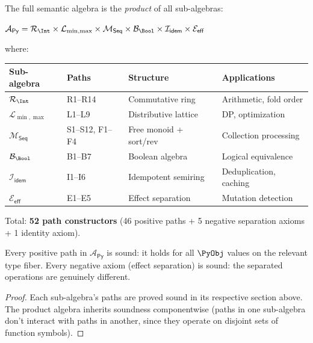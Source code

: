 The full semantic algebra is the \emph{product} of all sub-algebras:

\begin{definition}
\label{def:full-algebra}
$\mathcal{A}_\mathsf{Py} = \mathcal{R}_\Int \times \mathcal{L}_{\min,\max}
\times \mathcal{M}_\mathsf{Seq} \times \mathcal{B}_\Bool \times
\mathcal{I}_\mathsf{idem} \times \mathcal{E}_\mathsf{eff}$

where:
\begin{center}
\begin{tabular}{l l l l}
  \textbf{Sub-algebra} & \textbf{Paths} & \textbf{Structure} &
  \textbf{Applications} \\
  \hline
  $\mathcal{R}_\Int$ & R1--R14 & Commutative ring &
    Arithmetic, fold order \\
  $\mathcal{L}_{\min,\max}$ & L1--L9 & Distributive lattice &
    DP, optimization \\
  $\mathcal{M}_\mathsf{Seq}$ & S1--S12, F1--F4 &
    Free monoid + sort/rev &
    Collection processing \\
  $\mathcal{B}_\Bool$ & B1--B7 & Boolean algebra &
    Logical equivalence \\
  $\mathcal{I}_\mathsf{idem}$ & I1--I6 & Idempotent semiring &
    Deduplication, caching \\
  $\mathcal{E}_\mathsf{eff}$ & E1--E5 & Effect separation &
    Mutation detection \\
\end{tabular}
\end{center}

Total: \textbf{52 path constructors} (46 positive paths + 5 negative
separation axioms + 1 identity axiom).
\end{definition}

\begin{theorem}
Every positive path in $\mathcal{A}_\mathsf{Py}$ is sound: it holds
for all $\PyObj$ values on the relevant type fiber.  Every negative
axiom (effect separation) is sound: the separated operations are
genuinely different.
\end{theorem}

\begin{proof}
Each sub-algebra's paths are proved sound in its respective section
above.  The product algebra inherits soundness componentwise (paths
in one sub-algebra don't interact with paths in another, since they
operate on disjoint sets of function symbols).
\end{proof}

